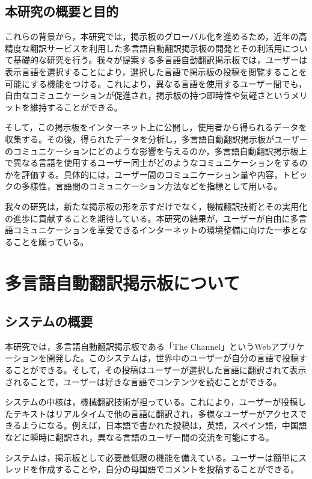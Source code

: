 \documentclass[b5paper,12pt]{jsreport}
\begin{document}
\section{本研究の概要と目的}

これらの背景から，本研究では，掲示板のグローバル化を進めるため，近年の高精度な翻訳サービスを利用した多言語自動翻訳掲示板の開発とその利活用について基礎的な研究を行う。我々が提案する多言語自動翻訳掲示板では，ユーザーは表示言語を選択することにより，選択した言語で掲示板の投稿を閲覧することを可能にする機能をつける。これにより，異なる言語を使用するユーザー間でも，自由なコミュニケーションが促進され，掲示板の持つ即時性や気軽さというメリットを維持することができる。

そして，この掲示板をインターネット上に公開し，使用者から得られるデータを収集する。その後，得られたデータを分析し，多言語自動翻訳掲示板がユーザーのコミュニケーションにどのような影響を与えるのか，多言語自動翻訳掲示板上で異なる言語を使用するユーザー同士がどのようなコミュニケーションをするのかを評価する。具体的には，ユーザー間のコミュニケーション量や内容，トピックの多様性，言語間のコミュニケーション方法などを指標として用いる。

我々の研究は，新たな掲示板の形を示すだけでなく，機械翻訳技術とその実用化の進歩に貢献することを期待している。本研究の結果が，ユーザーが自由に多言語コミュニケーションを享受できるインターネットの環境整備に向けた一歩となることを願っている。

\chapter{多言語自動翻訳掲示板について}

\section{システムの概要}

本研究では，多言語自動翻訳掲示板である「The Channel」というWebアプリケーションを開発した。このシステムは，世界中のユーザーが自分の言語で投稿することができる。そして，その投稿はユーザーが選択した言語に翻訳されて表示されることで，ユーザーは好きな言語でコンテンツを読むことができる。

システムの中核は，機械翻訳技術が担っている。これにより，ユーザーが投稿したテキストはリアルタイムで他の言語に翻訳され，多様なユーザーがアクセスできるようになる。例えば，日本語で書かれた投稿は，英語，スペイン語，中国語などに瞬時に翻訳され，異なる言語のユーザー間の交流を可能にする。

システムは，掲示板として必要最低限の機能を備えている。ユーザーは簡単にスレッドを作成することや，自分の母国語でコメントを投稿することができる。
\end{document}
